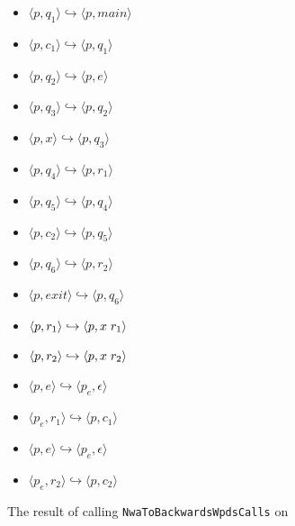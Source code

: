 \begin{figure}[p]
\begin{minipage}{0.42\textwidth}
  \end{minipage}
  \hspace{0.1\textwidth}
  \begin{minipage}{0.42\textwidth}
    \centering
    \begin{itemize}
      \centering
      \item{ $\langle p,q_1 \rangle \hookrightarrow \langle p,main \rangle$}
      \item{ $\langle p,c_1 \rangle \hookrightarrow \langle p,q_1 \rangle$}
      \item{ $\langle p,q_2 \rangle \hookrightarrow \langle p,e \rangle$}
      \item{ $\langle p,q_3 \rangle \hookrightarrow \langle p,q_2 \rangle$}
      \item{ $\langle p,x \rangle \hookrightarrow \langle p,q_3 \rangle$}
      \item{ $\langle p,q_4 \rangle \hookrightarrow \langle p,r_1 \rangle$}
      \item{ $\langle p,q_5 \rangle \hookrightarrow \langle p,q_4 \rangle$}
      \item{ $\langle p,c_2 \rangle \hookrightarrow \langle p,q_5 \rangle$}
      \item{ $\langle p,q_6 \rangle \hookrightarrow \langle p,r_2 \rangle$}
      \item{ $\langle p,exit \rangle \hookrightarrow \langle p,q_6 \rangle$}
      \item{ $\langle p,r_1 \rangle \hookrightarrow \langle p,x \hspace{.1cm} r_1 \rangle$}
      \item{ $\langle p,r_2 \rangle \hookrightarrow \langle p,x \hspace{.1cm} r_2 \rangle$}
      \item{ $\langle p,e \rangle \hookrightarrow \langle p_e, \epsilon \rangle$}
      \item{ $\langle p_e,r_1 \rangle \hookrightarrow \langle p,c_1 \rangle$}
      \item{ $\langle p,e \rangle \hookrightarrow \langle p_e, \epsilon \rangle$}
      \item{ $\langle p_e,r_2 \rangle \hookrightarrow \langle p,c_2 \rangle$}
    \end{itemize}
    \caption{The result of calling \texttt{NwaToBackwardsWpdsCalls} on }
    \label{Fi:NwaToWpds5}
  \end{minipage}
  \begin{minipage}{0.42\textwidth}
    \centering
    \begin{itemize}

\end{itemize}
\end{minipage}
\end{figure}
